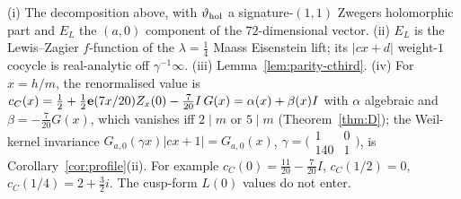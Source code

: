 \begin{theorem}\label{thm:Pstruct}
(i) The decomposition above, with $\vartheta_{\rm hol}$ a signature-$(1,1)$ Zwegers holomorphic part and $E_L$ the $(a,0)$ component of the $72$-dimensional vector.
(ii) $E_L$ is the Lewis--Zagier $f$-function of the $\lambda=\tfrac14$ Maass Eisenstein lift; its $|cx+d|$ weight-$1$ cocycle is real-analytic off $\gamma^{-1}\infty$.
(iii) Lemma~\ref{lem:parity-cthird}. (iv) For $x=h/m$, the renormalised value is $c_C(x)=\tfrac12+\tfrac12\mathbf{e}(7x/20)Z_x(0)-\tfrac7{20}I\,G(x)=\alpha(x)+\beta(x)I$ with $\alpha$ algebraic and
$\beta=-\tfrac7{20}G(x)$, which vanishes iff $2\mid m$ or $5\mid m$ (Theorem~\ref{thm:D}); the Weil-kernel invariance $G_{a,0}(\gamma x)|cx+1|=G_{a,0}(x)$,
$\gamma=\bigl(\begin{smallmatrix}1&0\\140&1\end{smallmatrix}\bigr)$, is Corollary~\ref{cor:profile}(ii). For example $c_C(0)=\tfrac{11}{20}-\tfrac7{20}I$, $c_C(1/2)=0$, $c_C(1/4)=2+\tfrac32i$.
The cusp-form $L(0)$ values do not enter.
\end{theorem}
\begin{center}\small{}\end{center}
